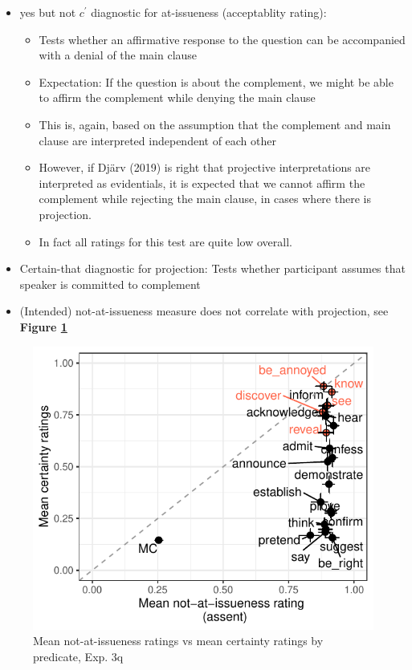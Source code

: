 \documentclass[11pt]{article}
\begin{document}
		\begin{itemize}
				\item yes but not $c^\prime$ diagnostic for at-issueness (acceptablity rating):
				\begin{itemize}
					\item Tests whether an affirmative response to the question can be accompanied with a denial of the main clause

					\item Expectation: If the question is about the complement, we might be able to affirm the complement while denying the main clause

					\item This is, again, based on the assumption that the complement and main clause are interpreted independent of each other

					\item However, if Djärv (2019) is right that projective interpretations are interpreted as evidentials, it is expected that we cannot affirm the complement while rejecting the main clause, in cases where there is projection.

					\item In fact all ratings for this test are quite low overall.

				\end{itemize}
				

				\item Certain-that diagnostic for projection: Tests whether participant assumes that speaker is committed to complement

				\item (Intended) not-at-issueness measure does not correlate with projection, see \textbf{Figure \ref{fig:q3-correl}}
			\end{itemize}

			\begin{figure}[h]
				\centering
				\includegraphics[]{figures/q3-correl.pdf}
				\caption{Mean not-at-issueness ratings vs mean certainty ratings by predicate, Exp. 3q
				\label{fig:q3-correl}}
			\end{figure}
\end{document}
